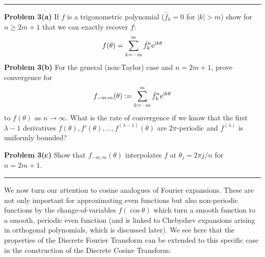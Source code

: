 \documentclass[12pt,a4paper]{article}
\begin{document}
\rule{\textwidth}{1pt}
\textbf{Problem 3(a)} If $f$ is a trigonometric polynomial  ($\hat f_k = 0$ for $|k| > m$) show for $n \ensuremath{\geq} 2m+1$ that we can exactly recover $f$:
\[
f(\ensuremath{\theta}) = \ensuremath{\sum}_{k=-m}^m \hat f_k^n {\rm e}^{{\rm i} k \ensuremath{\theta}}
\]
\textbf{Problem 3(b)} For the general (non-Taylor) case and $n = 2m+1$, prove convergence for
\[
f_{-m:m}(\ensuremath{\theta}) := \ensuremath{\sum}_{k=-m}^m \hat f_k^n {\rm e}^{{\rm i} k \ensuremath{\theta}}
\]
to $f(\ensuremath{\theta})$ as $n \ensuremath{\rightarrow} \ensuremath{\infty}$. What is the rate of convergence if we know that the first $\ensuremath{\lambda}-1$ derivatives $f(\ensuremath{\theta}), f'(\ensuremath{\theta}), \ensuremath{\ldots}, f^{(\ensuremath{\lambda}-1)}(\ensuremath{\theta})$ are 2\ensuremath{\pi}-periodic and $f^{(\ensuremath{\lambda})}$ is uniformly bounded?

\textbf{Problem 3(c)} Show that $f_{-m:m}(\ensuremath{\theta})$ interpolates $f$ at $\ensuremath{\theta}_j = 2\ensuremath{\pi}j/n$ for $n = 2m+1$.

\rule{\textwidth}{1pt}
We now turn our attention to cosine analogues of Fourier expansions. These are not only important for approximating  even functions but also non-periodic functions by the change-of-variables $f(\cos \ensuremath{\theta})$ which turn a smooth function to a smooth, periodic even function (and is linked to Chebyshev expansions arising in orthogonal polynomials, which is discussed later). We see here that the properties of the Discrete Fourier Transform can be extended to this specific case in the construction of the Discrete Cosine Transform:
\end{document}
